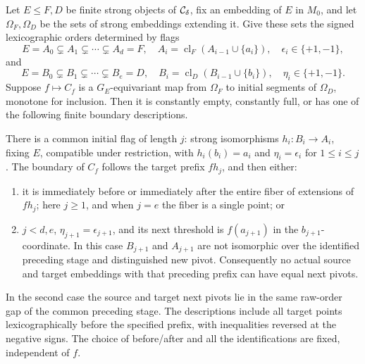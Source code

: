 \begin{lemma}
\label{G:monotone-lex-cuts}
Let $E\le F,D$ be finite strong objects of $\mathcal C_\delta$, fix an
embedding of $E$ in $M_0$, and let $\Omega_F,\Omega_D$ be the
sets of strong embeddings extending it. Give these sets the
signed lexicographic orders determined by flags
\[
 E=A_0\subsetneq A_1\subsetneq\cdots\subsetneq A_d=F,
 \quad A_i=\operatorname{cl}_F(A_{i-1}\cup\{a_i\}),
 \quad \epsilon_i\in\{+1,-1\},
\]
and
\[
 E=B_0\subsetneq B_1\subsetneq\cdots\subsetneq B_e=D,
 \quad B_i=\operatorname{cl}_D(B_{i-1}\cup\{b_i\}),
 \quad \eta_i\in\{+1,-1\}.
\]
Suppose $f\mapsto C_f$ is a $G_E$-equivariant map from
$\Omega_F$ to initial segments of $\Omega_D$, monotone for
inclusion. Then it is constantly empty, constantly full, or
has one of the following finite boundary descriptions.

There is a common initial flag of length $j$: strong
isomorphisms $h_i:B_i\to A_i$, fixing $E$, compatible under
restriction, with $h_i(b_i)=a_i$ and
$\eta_i=\epsilon_i$ for $1\le i\le j$. The boundary of
$C_f$ follows the target prefix $f h_j$, and then either:
\begin{enumerate}
\item it is immediately before or immediately after the
entire fiber of extensions of $f h_j$; here $j\ge1$, and
when $j=e$ the fiber is a single point; or
\item $j<d,e$, $\eta_{j+1}=\epsilon_{j+1}$, and its next
threshold is $f(a_{j+1})$ in the $b_{j+1}$-coordinate.
In this case $B_{j+1}$ and $A_{j+1}$ are not isomorphic
over the identified preceding stage and distinguished new
pivot. Consequently no actual source and target embeddings
with that preceding prefix can have equal next pivots.
\end{enumerate}
In the second case the source and target next pivots lie in
the same raw-order gap of the common preceding stage.
The descriptions include all target points lexicographically
before the specified prefix, with inequalities reversed at
the negative signs. The choice of before/after and all the
identifications are fixed, independent of $f$.
\end{lemma}
